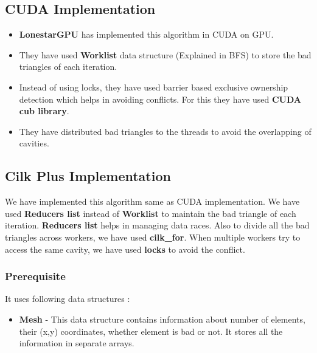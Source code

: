 \documentclass{article}
\begin{document}
\subsection{CUDA Implementation}
\begin{itemize}
\item \textbf{LonestarGPU} has implemented this algorithm in CUDA on GPU.
\item They have used \textbf{Worklist} data structure (Explained in BFS) to store the bad triangles of each iteration.
\item Instead of using locks, they have used barrier based exclusive ownership detection which helps in avoiding conflicts. For this they have used \textbf{CUDA cub library}.
\item They have distributed bad triangles to the threads to avoid the overlapping of cavities.
\end{itemize}


\subsection{Cilk Plus Implementation}
We have implemented this algorithm same as CUDA implementation. We have used \textbf{Reducers list} instead of \textbf{Worklist} to maintain the bad triangle of each iteration. \textbf{Reducers list} helps in managing data races. Also to divide all the bad triangles across workers, we have used \textbf{cilk\_for}. When multiple workers try to access the same cavity, we have used \textbf{locks} to avoid the conflict. 

\subsubsection{Prerequisite}
It uses following data structures :
\begin{itemize}
\item \textbf{Mesh} - This data structure contains information about number of elements, their (x,y) coordinates, whether element is bad or not. It stores all the information in separate arrays.
\end{itemize}
\end{document}

